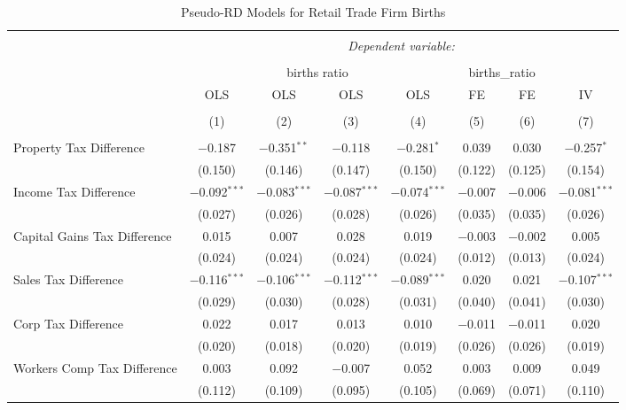 
\begin{table}[!htbp] \centering 
  \caption{Pseudo-RD Models for  Retail Trade Firm Births} 
  \label{} 
\begin{tabular}{@{\extracolsep{5pt}}lccccccc} 
\\[-1.8ex]\hline 
\hline \\[-1.8ex] 
 & \multicolumn{7}{c}{\textit{Dependent variable:}} \\ 
\cline{2-8} 
\\[-1.8ex] & \multicolumn{4}{c}{births ratio} & \multicolumn{2}{c}{births\_ratio} &   \\ 
 & OLS & OLS & OLS & OLS & FE & FE & IV \\ 
\\[-1.8ex] & (1) & (2) & (3) & (4) & (5) & (6) & (7)\\ 
\hline \\[-1.8ex] 
 Property Tax Difference & $-$0.187 & $-$0.351$^{**}$ & $-$0.118 & $-$0.281$^{*}$ & 0.039 & 0.030 & $-$0.257$^{*}$ \\ 
  & (0.150) & (0.146) & (0.147) & (0.150) & (0.122) & (0.125) & (0.154) \\ 
  Income Tax Difference & $-$0.092$^{***}$ & $-$0.083$^{***}$ & $-$0.087$^{***}$ & $-$0.074$^{***}$ & $-$0.007 & $-$0.006 & $-$0.081$^{***}$ \\ 
  & (0.027) & (0.026) & (0.028) & (0.026) & (0.035) & (0.035) & (0.026) \\ 
  Capital Gains Tax Difference & 0.015 & 0.007 & 0.028 & 0.019 & $-$0.003 & $-$0.002 & 0.005 \\ 
  & (0.024) & (0.024) & (0.024) & (0.024) & (0.012) & (0.013) & (0.024) \\ 
  Sales Tax Difference & $-$0.116$^{***}$ & $-$0.106$^{***}$ & $-$0.112$^{***}$ & $-$0.089$^{***}$ & 0.020 & 0.021 & $-$0.107$^{***}$ \\ 
  & (0.029) & (0.030) & (0.028) & (0.031) & (0.040) & (0.041) & (0.030) \\ 
  Corp Tax Difference & 0.022 & 0.017 & 0.013 & 0.010 & $-$0.011 & $-$0.011 & 0.020 \\ 
  & (0.020) & (0.018) & (0.020) & (0.019) & (0.026) & (0.026) & (0.019) \\ 
  Workers Comp Tax Difference & 0.003 & 0.092 & $-$0.007 & 0.052 & 0.003 & 0.009 & 0.049 \\ 
  & (0.112) & (0.109) & (0.095) & (0.105) & (0.069) & (0.071) & (0.110) \\ 

\end{tabular}
\end{table}
